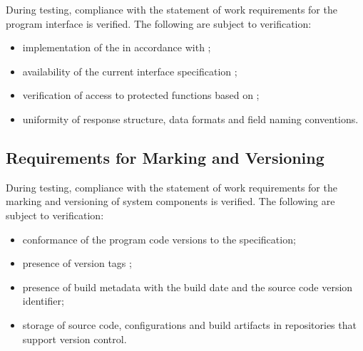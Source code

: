 \documentclass[12pt,a4paper]{extarticle}
\begin{document}
\begin{hseExample}
During testing, compliance with the statement of work requirements for the program interface is verified. The following are subject to verification:

\begin{itemize}[leftmargin=1.25cm]
    \item implementation of the  in accordance with ;
    \item availability of the current interface specification ;
    \item verification of access to protected functions based on ;
    \item uniformity of response structure, data formats and field naming conventions.
\end{itemize}
\end{hseExample}

\subsection{Requirements for Marking and Versioning}

\begin{hseExample}
During testing, compliance with the statement of work requirements for the marking and versioning of system components is verified. The following are subject to verification:

\begin{itemize}[leftmargin=1.25cm]
    \item conformance of the program code versions to the  specification;
    \item presence of version tags ;
    \item presence of build metadata with the build date and the source code version identifier;
    \item storage of source code, configurations and build artifacts in repositories that support version control.
\end{itemize}
\end{hseExample}
\end{document}
